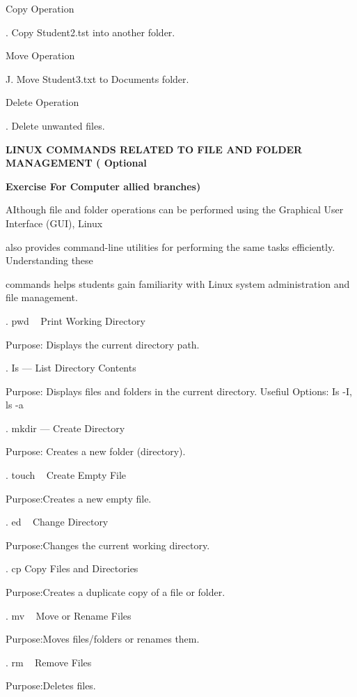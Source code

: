\documentclass[10pt,a4paper]{article}
\begin{document}
\noindent Copy Operation\par
{}. Copy Student2.tst into another folder.\par
\noindent Move Operation\par
\noindent J. Move Student3.txt to Documents folder.\par
\noindent Delete Operation\par
{}. Delete unwanted files.\par
\clearpage
\medskip\noindent\textbf{LINUX COMMANDS RELATED TO FILE AND FOLDER MANAGEMENT ( Optional}\par
\medskip\noindent\textbf{Exercise For Computer allied branches)}\par
\noindent AIthough file and folder operations can be performed using the Graphical User Interface (GUI), Linux\par
\noindent also provides command-line utilities for performing the same tasks efficiently. Understanding these\par
\noindent commands helps students gain familiarity with Linux system administration and file management.\par
{}. pwd ~ Print Working Directory\par
\noindent Purpose: Displays the current directory path.\par
{}. Is — List Directory Contents\par
\noindent Purpose: Displays files and folders in the current directory. Usefiul Options: Is -I, ls -a\par
{}. mkdir — Create Directory\par
\noindent Purpose: Creates a new folder (directory).\par
{}. touch ~ Create Empty File\par
\noindent Purpose:Creates a new empty file.\par
{}. ed ~ Change Directory\par
\noindent Purpose:Changes the current working directory.\par
{}. cp Copy Files and Directories\par
\noindent Purpose:Creates a duplicate copy of a file or folder.\par
{}. mv ~ Move or Rename Files\par
\noindent Purpose:Moves files/folders or renames them.\par
{}. rm ~ Remove Files\par
\noindent Purpose:Deletes files.\par
\end{document}
